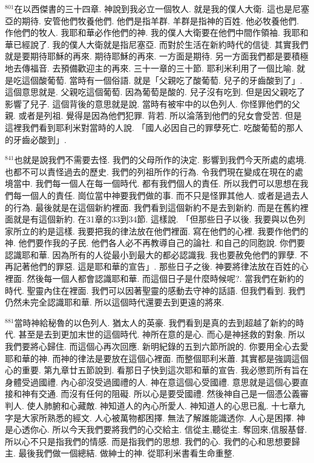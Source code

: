\documentclass{book}
\begin{document}
$^{801}$在以西傑書的三十四章.
神說到我必立一個牧人.
就是我的僕人大衛.
這也是尼塞亞的期待.
安管他們牧養他們.
他們是指羊群.
羊群是指神的百姓.
他必牧養他們.
作他們的牧人.
我耶和華必作他們的神.
我的僕人大衛要在他們中間作領袖.
我耶和華已經說了.
我的僕人大衛就是指尼塞亞.
而對於生活在新約時代的信徒.
其實我們就是要期待耶穌的再來.
期待耶穌的再來.
一方面是期待.
另一方面我們都是要積極地去傳福音.
去預備歡迎主的再來.
三十一章的三十節.
耶利米利用了一個比喻.
就是吃這個酸葡萄.
當時有一個俗語.
就是「父親吃了酸葡萄.
兒子的牙齒酸到了」.
這個意思就是.
父親吃這個葡萄.
因為葡萄是酸的.
兒子沒有吃到.
但是因父親吃了影響了兒子.
這個背後的意思就是說.
當時有被牢中的以色列人.
你怪罪他們的父親.
或者是列祖.
覺得是因為他們犯罪.
背若.
所以淪落到他們的兒女會受苦.
但是這裡我們看到耶利米對當時的人說.
「國人必因自己的罪孽死亡.
吃酸葡萄的那人的牙齒必酸到」.

$^{841}$也就是說我們不需要去怪.
我們的父母所作的決定.
影響到我們今天所處的處境.
也都不可以責怪過去的歷史.
我們的列祖所作的行為.
令我們現在變成在現在的處境當中.
我們每一個人在每一個時代.
都有我們個人的責任.
所以我們可以思想在我們每一個人的責任.
崗位當中神要我們做的事.
而不只是怪罪其他人.
或者是過去人的行為.
最後就是在這個新約裡面.
我們看到這個新約不是去到新約.
而是在舊約裡面就是有這個新約.
在31章的33到34節.
這樣說.
「但那些日子以後.
我要與以色列家所立的約是這樣.
我要把我的律法放在他們裡面.
寫在他們的心裡.
我要作他們的神.
他們要作我的子民.
他們各人必不再教導自己的論社.
和自己的同胞說.
你們要認識耶和華.
因為所有的人從最小到最大的都必認識我.
我也要赦免他們的罪孽.
不再記著他們的罪惡.
這是耶和華的宣告」.
那些日子之後.
神要將律法放在百姓的心裡面.
然後每一個人都會認識耶和華.
而這個日子是什麼時候呢?.
當我們在新約的時代.
聖靈內住在裡面.
我們可以因著聖靈的感動去守神的話語.
但我們看到.
我們仍然未完全認識耶和華.
所以這個時代還要去到更遠的將來.

$^{881}$當時神給秘魯的以色列人.
猶太人的英豪.
我們看到是真的去到超越了新約的時代.
甚至是去到更加末世的這個時代.
神所在意的是心.
而心是神拯救的對象.
所以我們要將心歸住.
而這個心再次回應.
新明紀錄的五到六節所說的.
你要用全心去愛耶和華的神.
而神的律法是要放在這個心裡面.
而整個耶利米蕭.
其實都是強調這個心的重要.
第九章廿五節說到.
看那日子快到這次耶和華的宣告.
我必懲罰所有旨在身體受過國禮.
內心卻沒受過國禮的人.
神在意這個心受國禮.
意思就是這個心要直接和神有交通.
而沒有任何的阻礙.
所以心是要受國禮.
然後神自己是一個憑公義審判人.
使人肺腑和心藏敵.
神知道人的內心所愛人.
神知道人的心思已亂.
十七章九字是大家所熟悉的經文.
人心被萬物都困擇.
無法了解誰能識透你.
人心是困擇.
神是心透你心.
所以今天我們要將我們的心交給主.
信從主,聽從主.
奪回來,信服基督.
所以心不只是指我們的情感.
而是指我們的思想.
我們的心.
我們的心和思想要歸主.
最後我們做一個總結.
做紳士的神.
從耶利米書看生命重整.
\end{document}
